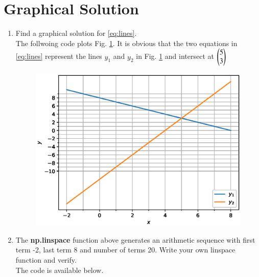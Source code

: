 \documentclass[journal,12pt,twocolumn]{IEEEtran}
\renewcommand\thesection{\arabic{section}}
\begin{document}
\begin{enumerate}[label=\thesection.\arabic*
,ref=\thesection.\theenumi]
\end{enumerate}

\section{Graphical Solution}
\begin{enumerate}[label=\thesection.\arabic*
,ref=\thesection.\theenumi]
\item Find a graphical solution for \eqref{eq:lines}.
\label{prob:graph}
\\
\solution The follwoing code plots Fig. \ref{fig:draw_line}.  It is obvious that the two equations in 
\eqref{eq:lines} represent the lines $y_1$ and $y_2$ in Fig. \ref{fig:draw_line} and intersect at $\begin{pmatrix}5 
\\3\end{pmatrix}$

%
\begin{figure}
\centering
\includegraphics[width=\columnwidth]{./figs/draw_line.eps}
\caption{}
\label{fig:draw_line}
\end{figure}
\item The \textbf{np.linspace} function above generates an arithmetic sequence with first term -2, last term 8 
and 
number of terms 20.  Write your own linspace function and verify.
\\
\solution The code is available below.

\end{enumerate}
\end{document}
